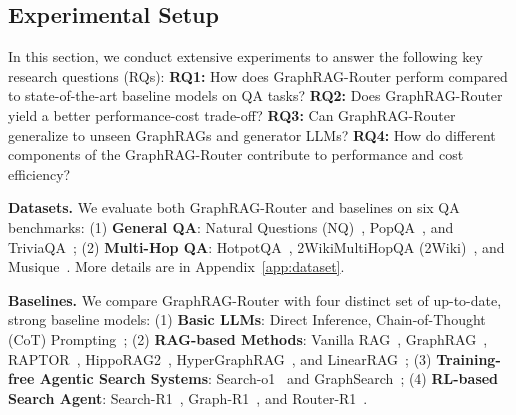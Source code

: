 \subsection{Experimental Setup}
In this section, we conduct extensive experiments to answer the following key research questions (RQs): \textbf{RQ1:} How does GraphRAG-Router perform compared to state-of-the-art baseline models on QA tasks? \textbf{RQ2:} Does GraphRAG-Router yield a better performance-cost trade-off?
\textbf{RQ3:} Can GraphRAG-Router generalize to unseen GraphRAGs and generator LLMs? \textbf{RQ4:} How do different components of the GraphRAG-Router contribute to
performance and cost efficiency?

\noindent\textbf{Datasets.}
We evaluate both GraphRAG-Router and baselines on six QA benchmarks: (1) \textbf{General QA}: Natural Questions (NQ)~\cite{nq}, PopQA~\cite{popqa}, and TriviaQA~\cite{triviaqa}; (2) \textbf{Multi-Hop QA}: HotpotQA~\cite{hotpotqa}, 2WikiMultiHopQA (2Wiki)~\cite{2wiki}, and Musique~\cite{musique}. More details are in Appendix~\ref{app:dataset}.

\noindent\textbf{Baselines.}
We compare GraphRAG-Router with four distinct set of up-to-date, strong baseline models:
(1) \textbf{Basic LLMs}: Direct Inference, Chain-of-Thought (CoT) Prompting~\cite{cot};
(2) \textbf{RAG-based Methods}: Vanilla RAG~\cite{RAG}, GraphRAG~\cite{GraphRAG}, RAPTOR~\cite{RAPTOR}, HippoRAG2~\cite{HippoRAG2}, HyperGraphRAG~\cite{HyperGraph}, and LinearRAG~\cite{LinearRAG};
(3) \textbf{Training-free Agentic Search Systems}: Search-o1~\cite{Search-o1} and GraphSearch~\cite{GraphSearch};
(4) \textbf{RL-based Search Agent}: Search-R1~\cite{Search-R1}, Graph-R1~\cite{Graph-R1}, and Router-R1~\cite{Router-R1}.



